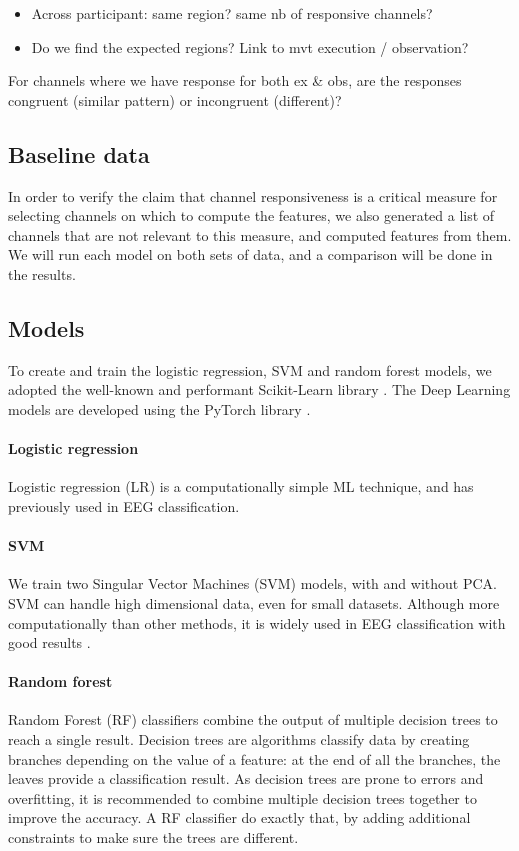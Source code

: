 \documentclass[10pt,conference,compsocconf]{IEEEtran}
\begin{document}
\begin{itemize}
    \item Across participant: same region? same nb of responsive channels?
    \item Do we find the expected regions? Link to mvt execution / observation?
\end{itemize}

For channels where we have response for both ex \& obs, are the responses congruent (similar pattern) or incongruent (different)?

\subsection{Baseline data}
In order to verify the claim that channel responsiveness is a critical measure for selecting channels on which to compute the features, we also generated a list of channels that are not relevant to this measure, and computed features from them. We will run each model on both sets of data, and a comparison will be done in the results.

\subsection{Models}
To create and train the logistic regression, SVM and random forest models, we adopted the well-known and performant Scikit-Learn library \cite{scikitlearn}. The Deep Learning models are developed using the PyTorch library \cite{pytorch}.

\paragraph{Logistic regression}
Logistic regression (LR) is a computationally simple ML technique, and has previously used in EEG classification\cite{SUBASI200587, NIPS2006_35937e34}.

\paragraph{SVM}
We train two Singular Vector Machines (SVM) models, with and without PCA. SVM can handle high dimensional data, even for small datasets. Although more computationally than other methods, it is widely used in EEG classification with good results \cite{knn_svm_review}.

\paragraph{Random forest}
Random Forest (RF) classifiers combine the output of multiple decision trees to reach a single result. Decision trees are algorithms classify data by creating branches depending on the value of a feature: at the end of all the branches, the leaves provide a classification result. As decision trees are prone to errors and overfitting, it is recommended to combine multiple decision trees together to improve the accuracy. A RF classifier do exactly that, by adding additional constraints to make sure the trees are different.
\end{document}
